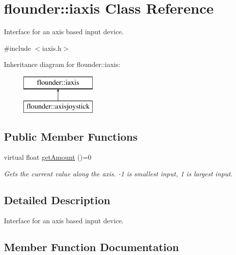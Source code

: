 \hypertarget{classflounder_1_1iaxis}{}\section{flounder\+:\+:iaxis Class Reference}
\label{classflounder_1_1iaxis}


Interface for an axis based input device.  




{\ttfamily \#include $<$iaxis.\+h$>$}

Inheritance diagram for flounder\+:\+:iaxis\+:\begin{figure}[H]
\begin{center}
\leavevmode
\includegraphics[height=2.000000cm]{classflounder_1_1iaxis}
\end{center}
\end{figure}
\subsection*{Public Member Functions}
\begin{DoxyCompactItemize}
\item 
virtual float \hyperlink{classflounder_1_1iaxis_a067a133edfde2ee8e2689df71328bf03}{get\+Amount} ()=0
\begin{DoxyCompactList}\small\item\em Gets the current value along the axis. -\/1 is smallest input, 1 is largest input. \end{DoxyCompactList}\end{DoxyCompactItemize}


\subsection{Detailed Description}
Interface for an axis based input device. 



\subsection{Member Function Documentation}
\mbox{\label{classflounder_1_1iaxis_a067a133edfde2ee8e2689df71328bf03}} 
